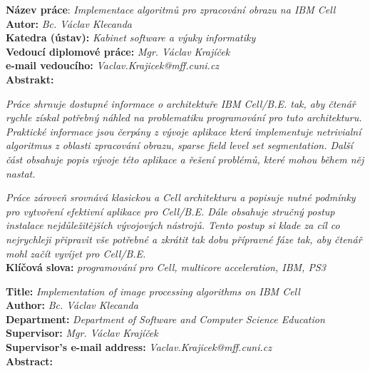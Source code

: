 \raggedbottom


\noindent
\textbf{Název práce}: \textit{Implementace algoritmů pro zpracování obrazu na IBM Cell} \\
\textbf{Autor:} \textit{Bc. Václav Klecanda} \\
\textbf{Katedra (ústav):} \textit{Kabinet software a výuky informatiky} \\
\textbf{Vedoucí diplomové práce:} \textit{Mgr. Václav Krajíček} \\
\textbf{e-mail vedoucího:} \textit{Vaclav.Krajicek@mff.cuni.cz} \\
\textbf{Abstrakt:} \\

\par
\noindent
\textit{
Práce shrnuje dostupné informace o architektuře IBM \mbox{Cell/B.E.} tak, aby čtenář rychle získal potřebný náhled na problematiku programování pro tuto architekturu.
Praktické informace jsou čerpány z vývoje aplikace která implementuje netrivialní algoritmus z oblasti zpracování obrazu, sparse field level set segmentation.
Další část obsahuje popis vývoje této aplikace a řešení problémů, které mohou během něj nastat.
}\\
\par
\noindent
\textit{
Práce zároveň srovnává klasickou a Cell architekturu a popisuje nutné podmínky pro vytvoření efektivní aplikace pro \mbox{Cell/B.E.}
Dále obsahuje stručný postup instalace nejdůležitějších vývojových nástrojů.
Tento postup si klade za cíl co nejrychleji připravit vše potřebné a zkrátit tak dobu přípravné fáze tak, aby čtenář mohl začít vyvíjet pro \mbox{Cell/B.E.}
}\\

\noindent
\textbf{Klíčová slova:} \textit{programování pro Cell, multicore acceleration, IBM, PS3} \\

\pagebreak


\noindent
\textbf{Title:} \textit{Implementation of image processing algorithms on IBM Cell} \\
\textbf{Author:} \textit{Bc. Václav Klecanda} \\
\textbf{Department:} \textit{Department of Software and Computer Science Education} \\
\textbf{Supervisor:} \textit{Mgr. Václav Krajíček} \\
\textbf{Supervisor's e-mail address:} \textit{Vaclav.Krajicek@mff.cuni.cz} \\
\textbf{Abstract:} \\

